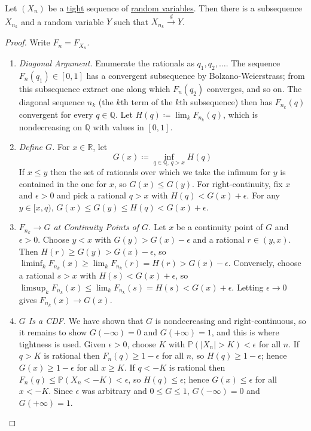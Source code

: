 	\begin{theorem}
	  \label{thm:helly-selection-theorem}
		Let $(X_n)$ be a \hyperref[def:tight-sequence-of-random-variables]{tight} sequence of \hyperref[def:random-variable]{random variables}. Then there is a subsequence $X_{n_k}$ and a random variable $Y$ such that $X_{n_k} \xrightarrow{d} Y$. 
	\end{theorem}
	\begin{proof}
		Write $F_n = F_{X_n}$. 

		\begin{enumerate}
		\item \textit{Diagonal Argument.} Enumerate the rationals as $q_1, q_2, \ldots$. The sequence $F_n (q_1) \in [0, 1]$ has a convergent subsequence by Bolzano-Weierstrass; from this subsequence extract one along which $F_n (q_2)$ converges, and so on. The diagonal sequence $n_k$ (the $k$th term of the $k$th subsequence) then has $F_{n_k} (q)$ convergent for every $q \in \mathbb{Q}$. Let $H(q) \coloneqq \lim_k F_{n_k} (q)$, which is nondecreasing on $\mathbb{Q}$ with values in $[0, 1]$. 

		\item \textit{Define $G$.} For $x \in \mathbb{R}$, let 
		\begin{equation}
			G(x) \coloneqq \inf_{q \in \mathbb{Q}, \, q > x} H(q)
		\end{equation}
		If $x \leq y$ then the set of rationals over which we take the infimum for $y$ is contained in the one for $x$, so $G(x) \leq G(y)$. For right-continuity, fix $x$ and $\epsilon > 0$ and pick a rational $q > x$ with $H(q) < G(x) + \epsilon$. For any $y \in [x, q)$, $G(x) \leq G(y) \leq H(q) < G(x) + \epsilon$. 

		\item \textit{$F_{n_k} \to G$ at Continuity Points of $G$.} Let $x$ be a continuity point of $G$ and $\epsilon > 0$. Choose $y < x$ with $G(y) > G(x) - \epsilon$ and a rational $r \in (y, x)$. Then $H(r) \geq G(y) > G(x) - \epsilon$, so $\liminf_k F_{n_k} (x) \geq \lim_k F_{n_k} (r) = H(r) > G(x) - \epsilon$. Conversely, choose a rational $s > x$ with $H(s) < G(x) + \epsilon$, so $\limsup_k F_{n_k} (x) \leq \lim_k F_{n_k} (s) = H(s) < G(x) + \epsilon$. Letting $\epsilon \to 0$ gives $F_{n_k} (x) \to G(x)$. 

		\item \textit{$G$ Is a CDF.} We have shown that $G$ is nondecreasing and right-continuous, so it remains to show $G(-\infty) = 0$ and $G(+\infty) = 1$, and this is where tightness is used. Given $\epsilon > 0$, choose $K$ with $\mathbb{P}(|X_n| > K) < \epsilon$ for all $n$. If $q > K$ is rational then $F_n (q) \geq 1 - \epsilon$ for all $n$, so $H(q) \geq 1 - \epsilon$; hence $G(x) \geq 1 - \epsilon$ for all $x \geq K$. If $q < -K$ is rational then $F_n (q) \leq \mathbb{P}(X_n < -K) < \epsilon$, so $H(q) \leq \epsilon$; hence $G(x) \leq \epsilon$ for all $x < -K$. Since $\epsilon$ was arbitrary and $0 \leq G \leq 1$, $G(-\infty) = 0$ and $G(+\infty) = 1$. 


\end{enumerate}
\end{proof}
